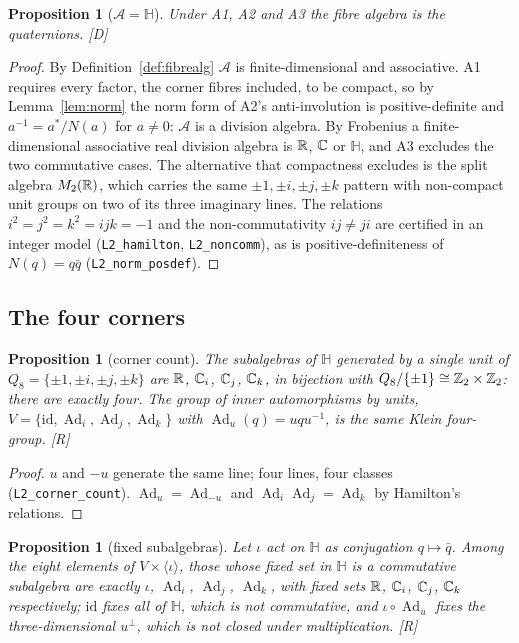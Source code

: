 \documentclass[11pt,a4paper]{article}
\theoremstyle{plain}
\newtheorem{proposition}[theorem]{Proposition}
\theoremstyle{definition}
\theoremstyle{remark}
\newcommand{\Hquat}{\mathbb{H}}
\newcommand{\Ad}{\operatorname{Ad}}
\newcommand{\rigR}{[\textup{R}]}
\newcommand{\rigD}{[\textup{D}]}
\begin{document}
\begin{proposition}[$\mathcal{A}=\Hquat$]\label{prop:H}
Under A1, A2 and A3 the fibre algebra is the quaternions. \rigD
\end{proposition}

\begin{proof}
By Definition~\ref{def:fibrealg} $\mathcal{A}$ is finite-dimensional and associative. A1 requires every factor, the corner fibres included, to be compact, so by Lemma~\ref{lem:norm} the norm form of A2's anti-involution is positive-definite and $a^{-1}=a^{*}/N(a)$ for $a\neq0$: $\mathcal{A}$ is a division algebra. By Frobenius \cite{Frobenius1878} a finite-dimensional associative real division algebra is $\mathbb{R}$, $\mathbb{C}$ or $\Hquat$, and A3 excludes the two commutative cases. The alternative that compactness excludes is the split algebra $M_{2}(\mathbb{R})$, which carries the same $\pm1,\pm i,\pm j,\pm k$ pattern with non-compact unit groups on two of its three imaginary lines. The relations $i^{2}=j^{2}=k^{2}=ijk=-1$ and the non-commutativity $ij\neq ji$ are certified in an integer model (\texttt{L2\_hamilton}, \texttt{L2\_noncomm}), as is positive-definiteness of $N(q)=q\bar q$ (\texttt{L2\_norm\_posdef}).
\end{proof}

\subsection{The four corners}

\begin{proposition}[corner count]\label{prop:corners}
The subalgebras of $\Hquat$ generated by a single unit of $Q_{8}=\{\pm1,\pm i,\pm j,\pm k\}$ are $\mathbb{R}$, $\mathbb{C}_{i}$, $\mathbb{C}_{j}$, $\mathbb{C}_{k}$, in bijection with $Q_{8}/\{\pm1\}\cong\mathbb{Z}_{2}\times\mathbb{Z}_{2}$: there are exactly four. The group of inner automorphisms by units, $V=\{\mathrm{id},\Ad_{i},\Ad_{j},\Ad_{k}\}$ with $\Ad_{u}(q)=uqu^{-1}$, is the same Klein four-group. \rigR
\end{proposition}

\begin{proof}
$u$ and $-u$ generate the same line; four lines, four classes (\texttt{L2\_corner\_count}). $\Ad_{u}=\Ad_{-u}$ and $\Ad_{i}\Ad_{j}=\Ad_{k}$ by Hamilton's relations.
\end{proof}

\begin{proposition}[fixed subalgebras]\label{prop:fixed}
Let $\iota$ act on $\Hquat$ as conjugation $q\mapsto\bar q$. Among the eight elements of $V\times\langle\iota\rangle$, those whose fixed set in $\Hquat$ is a commutative subalgebra are exactly $\iota$, $\Ad_{i}$, $\Ad_{j}$, $\Ad_{k}$, with fixed sets $\mathbb{R}$, $\mathbb{C}_{i}$, $\mathbb{C}_{j}$, $\mathbb{C}_{k}$ respectively; $\mathrm{id}$ fixes all of $\Hquat$, which is not commutative, and $\iota\circ\Ad_{u}$ fixes the three-dimensional $u^{\perp}$, which is not closed under multiplication. \rigR
\end{proposition}
\end{document}

